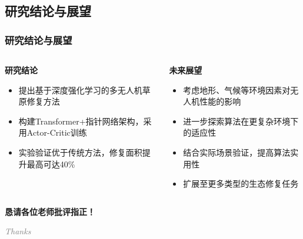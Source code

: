 \documentclass[11pt, aspectratio=169]{beamer}  %
\begin{document}
\subsection{研究结论与展望}
\begin{frame}
	\frametitle{研究结论与展望}
	\begin{columns}[T] %
		\begin{column}{0.5\textwidth}
			\textbf{研究结论}
			\begin{itemize}
				\item 提出基于深度强化学习的多无人机草原修复方法
				\item 构建Transformer+指针网络架构，采用Actor-Critic训练
				\item 实验验证优于传统方法，修复面积提升最高可达40\%
			\end{itemize}
		\end{column}
		\begin{column}{0.5\textwidth}
			\textbf{未来展望}
			\begin{itemize}
				\item 考虑地形、气候等环境因素对无人机性能的影响
				\item 进一步探索算法在更复杂环境下的适应性
				\item 结合实际场景验证，提高算法实用性
				\item 扩展至更多类型的生态修复任务
			\end{itemize}
		\end{column}
	\end{columns}
\end{frame}

\begin{frame}
	\begin{center}
		\vspace{2cm}
		{\Huge \sffamily\bfseries\textcolor{njupt}{恳请各位老师批评指正！}} %
		\vspace{0.5cm}

		{\large \itshape\textcolor{gray}{Thanks}}
	\end{center}
\end{frame}
\end{document}
